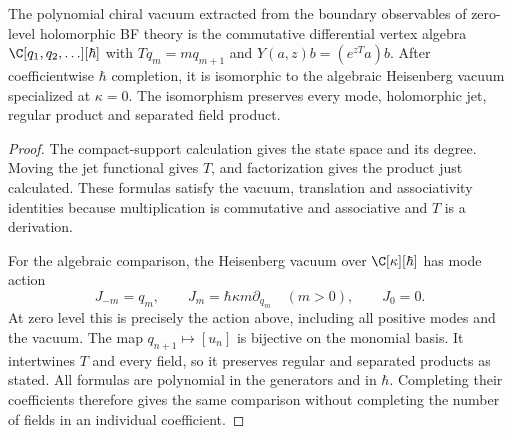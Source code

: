 \begin{theorem}
\label{thm:bf-zero-current}
The polynomial chiral vacuum extracted from the boundary observables
of zero-level holomorphic BF theory is the commutative differential
vertex algebra $\C[q_1,q_2,\ldots][\hbar]$ with
$Tq_m=mq_{m+1}$ and $Y(a,z)b=(e^{zT}a)b$.
After coefficientwise $\hbar$ completion, it is isomorphic to the
algebraic Heisenberg vacuum specialized at $\kappa=0$.
The isomorphism preserves every mode, holomorphic jet, regular
product and separated field product.
\end{theorem}
\begin{proof}
The compact-support calculation gives the state space and its degree.
Moving the jet functional gives $T$, and factorization gives the
product just calculated.  These formulas satisfy the vacuum,
translation and associativity identities because multiplication is
commutative and associative and $T$ is a derivation.

For the algebraic comparison, the Heisenberg vacuum over
$\C[\kappa][\hbar]$ has mode action
\[
 J_{-m}=q_m,\qquad
 J_m=\hbar\kappa m\partial_{q_m}\quad(m>0),\qquad J_0=0.
\]
At zero level this is precisely the action above, including all
positive modes and the vacuum.  The map $q_{n+1}\mapsto[u_n]$ is
bijective on the monomial basis.  It intertwines $T$ and every field,
so it preserves regular and separated products as stated.
All formulas are polynomial in the generators and in $\hbar$.
Completing their coefficients therefore gives the same comparison
without completing the number of fields in an individual coefficient.
\end{proof}

